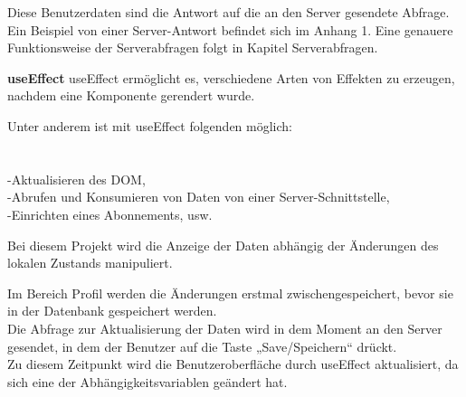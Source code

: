 Diese Benutzerdaten sind die Antwort auf die an den Server gesendete Abfrage.
Ein Beispiel von einer Server-Antwort befindet sich im Anhang 1.
Eine genauere Funktionsweise der Serverabfragen folgt in Kapitel Serverabfragen.
\\

\newpage

\textbf{useEffect}
useEffect ermöglicht es, verschiedene Arten von Effekten zu erzeugen, nachdem eine Komponente gerendert wurde.

Unter anderem ist mit useEffect folgenden möglich:\\\\
\\-Aktualisieren des DOM,
\\-Abrufen und Konsumieren von Daten von einer Server-Schnittstelle,
\\-Einrichten eines Abonnements, usw.
\\
\begin{flushleft}

  Bei diesem Projekt wird die Anzeige der Daten abhängig der Änderungen des lokalen Zustands manipuliert.
\end{flushleft}

Im Bereich Profil werden die Änderungen erstmal zwischengespeichert, bevor sie in der Datenbank gespeichert werden.
\\
Die Abfrage zur Aktualisierung der Daten wird in dem Moment an den Server gesendet, in dem der Benutzer auf die Taste „Save/Speichern“ drückt.
\\
Zu diesem Zeitpunkt wird die Benutzeroberfläche durch useEffect aktualisiert, da sich eine der Abhängigkeitsvariablen geändert hat.
\\

